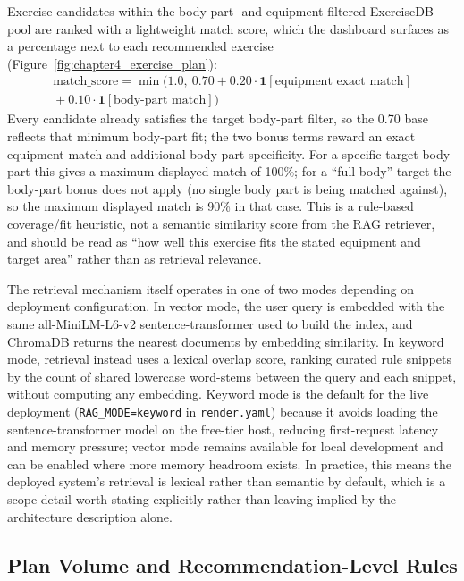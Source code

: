 \documentclass{aitthesis}
\begin{document}
Exercise candidates within the body-part- and equipment-filtered ExerciseDB pool are ranked with a lightweight match score, which the dashboard surfaces as a percentage next to each recommended exercise (Figure~\ref{fig:chapter4_exercise_plan}):
\begin{multline}
\text{match\_score}=\min\big(1.0,\ 0.70+0.20\cdot\mathbf{1}[\text{equipment exact match}] \\
{}+0.10\cdot\mathbf{1}[\text{body-part match}]\big)
\end{multline}
Every candidate already satisfies the target body-part filter, so the 0.70 base reflects that minimum body-part fit; the two bonus terms reward an exact equipment match and additional body-part specificity. For a specific target body part this gives a maximum displayed match of 100\%; for a ``full body'' target the body-part bonus does not apply (no single body part is being matched against), so the maximum displayed match is 90\% in that case. This is a rule-based coverage/fit heuristic, not a semantic similarity score from the RAG retriever, and should be read as ``how well this exercise fits the stated equipment and target area'' rather than as retrieval relevance.

The retrieval mechanism itself operates in one of two modes depending on deployment configuration. In vector mode, the user query is embedded with the same all-MiniLM-L6-v2 sentence-transformer used to build the index, and ChromaDB returns the nearest documents by embedding similarity. In keyword mode, retrieval instead uses a lexical overlap score, ranking curated rule snippets by the count of shared lowercase word-stems between the query and each snippet, without computing any embedding. Keyword mode is the default for the live deployment (\texttt{RAG\_MODE=keyword} in \texttt{render.yaml}) because it avoids loading the sentence-transformer model on the free-tier host, reducing first-request latency and memory pressure; vector mode remains available for local development and can be enabled where more memory headroom exists. In practice, this means the deployed system's retrieval is lexical rather than semantic by default, which is a scope detail worth stating explicitly rather than leaving implied by the architecture description alone.

\subsection{Plan Volume and Recommendation-Level Rules}
\end{document}
